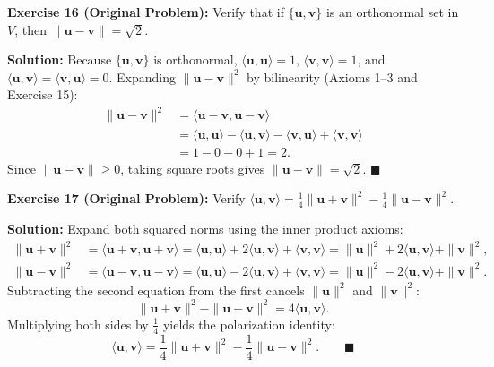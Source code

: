 \documentclass[11pt, letterpaper]{article}
\theoremstyle{definition}
\theoremstyle{remark}
\begin{document}
\textbf{Exercise 16 (Original Problem):} Verify that if $\{\mathbf{u}, \mathbf{v}\}$ is an orthonormal set in $V$, then $\|\mathbf{u} - \mathbf{v}\| = \sqrt{2}$.

\textbf{Solution:}
Because $\{\mathbf{u}, \mathbf{v}\}$ is orthonormal, $\langle \mathbf{u}, \mathbf{u} \rangle = 1$, $\langle \mathbf{v}, \mathbf{v} \rangle = 1$, and $\langle \mathbf{u}, \mathbf{v} \rangle = \langle \mathbf{v}, \mathbf{u} \rangle = 0$. Expanding $\|\mathbf{u} - \mathbf{v}\|^2$ by bilinearity (Axioms 1--3 and Exercise 15):
\begin{align*}
    \|\mathbf{u} - \mathbf{v}\|^2 &= \langle \mathbf{u} - \mathbf{v}, \mathbf{u} - \mathbf{v} \rangle \\
    &= \langle \mathbf{u}, \mathbf{u} \rangle - \langle \mathbf{u}, \mathbf{v} \rangle - \langle \mathbf{v}, \mathbf{u} \rangle + \langle \mathbf{v}, \mathbf{v} \rangle \\
    &= 1 - 0 - 0 + 1 = 2.
\end{align*}
Since $\|\mathbf{u} - \mathbf{v}\| \ge 0$, taking square roots gives $\|\mathbf{u} - \mathbf{v}\| = \sqrt{2}$. \hfill $\blacksquare$

\textbf{Exercise 17 (Original Problem):} Verify $\langle \mathbf{u}, \mathbf{v} \rangle = \frac{1}{4}\|\mathbf{u} + \mathbf{v}\|^2 - \frac{1}{4}\|\mathbf{u} - \mathbf{v}\|^2$.

\textbf{Solution:}
Expand both squared norms using the inner product axioms:
\begin{align*}
    \|\mathbf{u} + \mathbf{v}\|^2 &= \langle \mathbf{u} + \mathbf{v}, \mathbf{u} + \mathbf{v} \rangle = \langle \mathbf{u}, \mathbf{u} \rangle + 2\langle \mathbf{u}, \mathbf{v} \rangle + \langle \mathbf{v}, \mathbf{v} \rangle = \|\mathbf{u}\|^2 + 2\langle \mathbf{u}, \mathbf{v} \rangle + \|\mathbf{v}\|^2, \\
    \|\mathbf{u} - \mathbf{v}\|^2 &= \langle \mathbf{u} - \mathbf{v}, \mathbf{u} - \mathbf{v} \rangle = \langle \mathbf{u}, \mathbf{u} \rangle - 2\langle \mathbf{u}, \mathbf{v} \rangle + \langle \mathbf{v}, \mathbf{v} \rangle = \|\mathbf{u}\|^2 - 2\langle \mathbf{u}, \mathbf{v} \rangle + \|\mathbf{v}\|^2.
\end{align*}
Subtracting the second equation from the first cancels $\|\mathbf{u}\|^2$ and $\|\mathbf{v}\|^2$:
\[
    \|\mathbf{u} + \mathbf{v}\|^2 - \|\mathbf{u} - \mathbf{v}\|^2 = 4\langle \mathbf{u}, \mathbf{v} \rangle.
\]
Multiplying both sides by $\frac{1}{4}$ yields the polarization identity:
\[
    \langle \mathbf{u}, \mathbf{v} \rangle = \frac{1}{4}\|\mathbf{u} + \mathbf{v}\|^2 - \frac{1}{4}\|\mathbf{u} - \mathbf{v}\|^2. \qquad \blacksquare
\]
\end{document}
